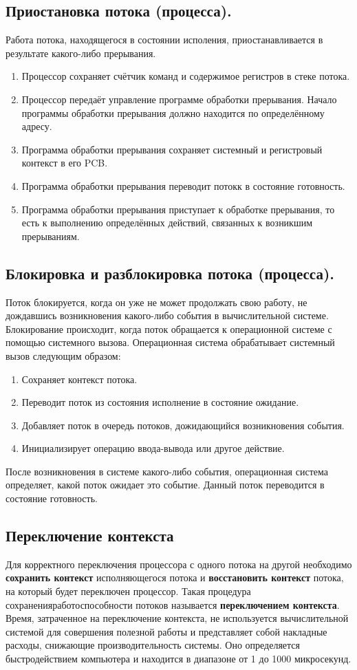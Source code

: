 \documentclass[a4paper]{article}
\begin{document}
\subsection{Приостановка потока (процесса).}
Работа потока, находящегося в состоянии исполения, приостанавливается в результате какого-либо прерывания.
\begin{enumerate}
        \item Процессор сохраняет счётчик команд и содержимое регистров в стеке потока.
	\item Процессор передаёт управление программе обработки прерывания. Начало программы обработки прерывания должно находится по определённому адресу.
	\item Программа обработки прерывания сохраняет системный и регистровый контекст в его PCB.
	\item Программа обработки прерывания переводит потокк в состояние готовность.
	\item Программа обработки прерывания приступает к обработке прерывания, то есть к выполнению определённых действий, связанных к возникшим прерываниям.
\end{enumerate}
\subsection{Блокировка и разблокировка потока (процесса).}
Поток блокируется, когда он уже не может продолжать свою работу, не дождавшись возникновения какого-либо события в вычислительной системе.\\
Блокирование происходит, когда поток обращается к операционной системе с помощью системного вызова. Операционная система обрабатывает системный вызов следующим образом:
\begin{enumerate}
        \item Сохраняет контекст потока.
	\item Переводит поток из состояния исполнение в состояние ожидание.
	\item Добавляет поток в очередь потоков, дожидающийся возникновения события.
	\item Инициализирует операцию ввода-вывода или другое действие.
\end{enumerate}
После возникновения в системе какого-либо события, операционная система определяет, какой поток ожидает это событие. Данный поток переводится в состояние готовность.
\subsection{Переключение контекста}
Для корректного переключения процессора с одного потока на другой необходимо \textbf{сохранить контекст} исполняющегося потока и \textbf{восстановить контекст} потока, на который будет переключен процессор. Такая процедура сохранения работоспособности потоков называется \textbf{переключением контекста}. Время, затраченное на переключение контекста, не используется вычислительной системой для совершения полезной работы и представляет собой накладные расходы, снижающие производительность системы. Оно определяется быстродействием компьютера и находится в диапазоне от 1 до 1000 микросекунд.  
\end{document}
